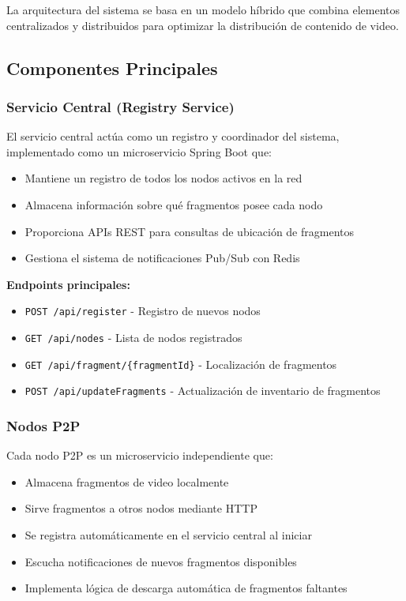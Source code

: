La arquitectura del sistema se basa en un modelo híbrido que combina elementos centralizados y distribuidos para optimizar la distribución de contenido de video.

\subsection*{Componentes Principales}

\subsubsection*{Servicio Central (Registry Service)}
El servicio central actúa como un registro y coordinador del sistema, implementado como un microservicio Spring Boot que:

\begin{itemize}
    \item Mantiene un registro de todos los nodos activos en la red
    \item Almacena información sobre qué fragmentos posee cada nodo
    \item Proporciona APIs REST para consultas de ubicación de fragmentos
    \item Gestiona el sistema de notificaciones Pub/Sub con Redis
\end{itemize}

\textbf{Endpoints principales:}
\begin{itemize}
    \item \texttt{POST /api/register} - Registro de nuevos nodos
    \item \texttt{GET /api/nodes} - Lista de nodos registrados
    \item \texttt{GET /api/fragment/\{fragmentId\}} - Localización de fragmentos
    \item \texttt{POST /api/updateFragments} - Actualización de inventario de fragmentos
\end{itemize}

\subsubsection*{Nodos P2P}
Cada nodo P2P es un microservicio independiente que:

\begin{itemize}
    \item Almacena fragmentos de video localmente
    \item Sirve fragmentos a otros nodos mediante HTTP
    \item Se registra automáticamente en el servicio central al iniciar
    \item Escucha notificaciones de nuevos fragmentos disponibles
    \item Implementa lógica de descarga automática de fragmentos faltantes
\end{itemize}

